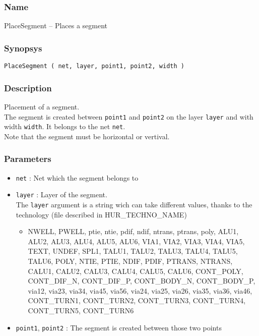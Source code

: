 \subsubsection{Name}

PlaceSegment -- Places a segment

\subsubsection{Synopsys}

\begin{verbatim}
PlaceSegment ( net, layer, point1, point2, width )
\end{verbatim}

\subsubsection{Description}

Placement of a segment.\\
\indent The segment is created between \verb-point1- and \verb-point2- on the layer \verb-layer- and with width \verb-width-. It belongs to the net \verb-net-.\\
\indent Note that the segment must be horizontal or vertival.
    
\subsubsection{Parameters}

\begin{itemize}
    \item \verb-net- : Net which the segment belongs to
    \item \verb-layer- : Layer of the segment.\\The \verb-layer- argument is a string wich can take different values, thanks to the technology (file described in HUR\_TECHNO\_NAME)
    \begin{itemize}
        \item NWELL, PWELL, ptie, ntie, pdif, ndif, ntrans, ptrans, poly, ALU1, ALU2, ALU3, ALU4, ALU5, ALU6, VIA1, VIA2, VIA3, VIA4, VIA5, TEXT, UNDEF, SPL1, TALU1, TALU2, TALU3, TALU4, TALU5, TALU6, POLY, NTIE, PTIE, NDIF, PDIF, PTRANS, NTRANS, CALU1, CALU2, CALU3, CALU4, CALU5, CALU6, CONT\_POLY, CONT\_DIF\_N, CONT\_DIF\_P, CONT\_BODY\_N, CONT\_BODY\_P, via12, via23, via34, via45, via56, via24, via25, via26, via35, via36, via46, CONT\_TURN1, CONT\_TURN2, CONT\_TURN3, CONT\_TURN4, CONT\_TURN5, CONT\_TURN6
    \end{itemize}
    \item \verb-point1-, \verb-point2- : The segment is created between those two points
\end{itemize}
    

